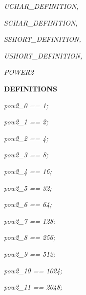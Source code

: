 \documentclass[11pt]{article}
\begin{document}
\begin{sloppypar}
\hspace*{0.20in}

\hspace*{0.20in}\it UCHAR\_DEFINITION\rm ,

\hspace*{0.20in}\it SCHAR\_DEFINITION\rm ,

\hspace*{0.20in}\it SSHORT\_DEFINITION\rm ,

\hspace*{0.20in}\it USHORT\_DEFINITION\rm ,

\hspace*{0.20in}\it POWER2 

\hspace*{0.20in}

\bf DEFINITIONS

\hspace*{0.20in}

\hspace*{0.20in}

\hspace*{0.20in}\it pow2\_0 \rm == \rm 1\rm ;

\hspace*{0.20in}\it pow2\_1 \rm == \rm 2\rm ;

\hspace*{0.20in}\it pow2\_2 \rm == \rm 4\rm ;

\hspace*{0.20in}\it pow2\_3 \rm == \rm 8\rm ;

\hspace*{0.20in}\it pow2\_4 \rm == \rm 1\rm 6\rm ;

\hspace*{0.20in}\it pow2\_5 \rm == \rm 3\rm 2\rm ;

\hspace*{0.20in}\it pow2\_6 \rm == \rm 6\rm 4\rm ;

\hspace*{0.20in}\it pow2\_7 \rm == \rm 1\rm 2\rm 8\rm ;

\hspace*{0.20in}\it pow2\_8 \rm == \rm 2\rm 5\rm 6\rm ;

\hspace*{0.20in}\it pow2\_9 \rm == \rm 5\rm 1\rm 2\rm ;

\hspace*{0.20in}\it pow2\_10 \rm == \rm 1\rm 0\rm 2\rm 4\rm ;\hspace*{0.20in}

\hspace*{0.20in}\it pow2\_11 \rm == \rm 2\rm 0\rm 4\rm 8\rm ;\hspace*{0.10in}


\end{sloppypar}
\end{document}
